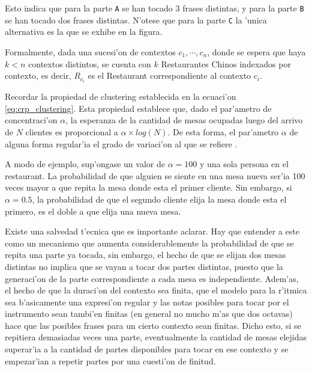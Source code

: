 \begin{imagen}
    \width{10cm}
\end{imagen}


Esto indica que para la parte \texttt{A} se han tocado 3 frases distintas, y para la parte \texttt{B} se han tocado dos frases distintas. 
N'otese que para la parte \texttt{C} la 'unica alternativa es la que se exhibe en la figura.

Formalmente, dada una sucesi'on de contextos $c_1, \cdots, c_n$, donde se espera que haya $k<n$ contextos distintos, se cuenta con $k$ Restaurantes Chinos indexados por contexto,
es decir, $R_{c_i}$ es el Restaurant correspondiente al contexto $c_i$. 

Recordar la propiedad de clustering establecida en la ecuaci'on \ref{eq:crp_clustering}. Esta propiedad 
establece que, dado el par'ametro de concentraci'on $\alpha$, la esperanza de la cantidad de mesas ocupadas luego del arrivo de $N$ clientes es proporcional a $\alpha\times log(N)$.
De esta forma, el par'ametro $\alpha$ de alguna forma regular'ia el grado de variaci'on al que se refiere \cite{Deliege90}. 

A modo de ejemplo, sup'ongase un valor de $\alpha=100$ y una sola persona
en el restaurant. La probabilidad de que alguien se siente en una mesa nueva ser'ia 100 veces mayor a que repita la mesa donde esta el primer cliente. Sin embargo, si $\alpha=0.5$, 
la probabilidad de que el segundo cliente elija la mesa donde esta el primero, es el doble a que elija una nueva mesa.

Existe una salvedad t'ecnica que es importante aclarar. Hay que entender a este como un mecanismo que aumenta considerablemente la probabilidad de que se repita una parte ya tocada,
sin embargo, el hecho de que se elijan dos mesas distintas no implica que se vayan a tocar dos partes distintas, puesto que la generaci'on de la parte correspondiente
a cada mesa es independiente. Adem'as, el hecho de que la duraci'on del contexto sea finita, que el modelo para la r'itmica sea b'asicamente una expresi'on regular y 
las notas posibles para tocar por el instrumento sean tambi'en finitas (en general no mucho m'as que dos octavas) hace que las posibles frases para un cierto contexto
sean finitas. Dicho esto, si se repitiera demasiadas veces una parte, eventualmente la cantidad de mesas elejidas superar'ia a la cantidad de partes disponibles
para tocar en ese contexto y se empezar'ian a repetir partes por una cuesti'on de finitud. 

